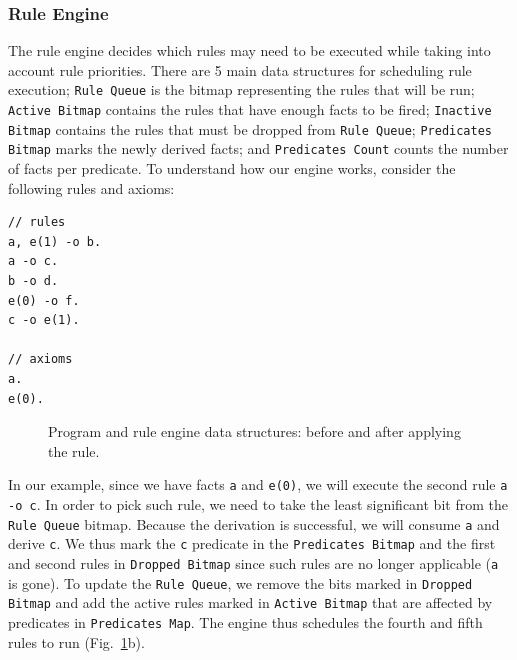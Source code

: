 \subsubsection{Rule Engine}\label{rule_engine}

The rule engine decides which rules may need to be executed while taking into account rule priorities.
There are 5 main data structures for scheduling rule execution;
\texttt{Rule Queue} is the bitmap representing the rules that will be run;
\texttt{Active Bitmap} contains the rules that have enough facts to be fired;
\texttt{Inactive Bitmap} contains the rules that must be dropped from \texttt{Rule Queue};
\texttt{Predicates Bitmap} marks the newly derived facts;
and \texttt{Predicates Count} counts the number of facts per predicate.
To understand how our engine works, consider the following rules and axioms:

{\footnotesize\begin{Verbatim}
// rules
a, e(1) -o b.
a -o c.
b -o d.
e(0) -o f.
c -o e(1).

// axioms
a.
e(0).
\end{Verbatim}
}

\begin{figure}[]
   \centering
   \caption{Program and rule engine data structures: before and after applying the  rule.}
   \label{fig:rule_engine}
\end{figure}


In our example, since we have facts \texttt{a} and \texttt{e(0)},
we will execute the second rule \texttt{a -o c}.
In order to pick such rule, we need to take the least significant bit from the \texttt{Rule Queue} bitmap.
Because the derivation is successful, we will consume \texttt{a} and derive \texttt{c}.
We thus mark the \texttt{c} predicate in the \texttt{Predicates Bitmap} and the first and second rules
in \texttt{Dropped Bitmap} since such rules are no longer applicable (\texttt{a} is gone). To update the \texttt{Rule Queue},
we remove the bits marked in \texttt{Dropped Bitmap} and add the active rules marked in \texttt{Active Bitmap} that are affected
by predicates in \texttt{Predicates Map}. The engine thus schedules the fourth and fifth rules to run (Fig.~\ref{fig:rule_engine}b).

